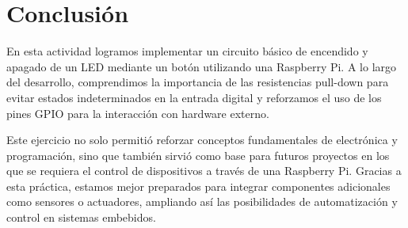\section{Conclusión}

En esta actividad logramos implementar un circuito básico de encendido y apagado de un LED mediante un botón utilizando una Raspberry Pi. A lo largo del desarrollo, comprendimos la importancia de las resistencias pull-down para evitar estados indeterminados en la entrada digital y reforzamos el uso de los pines GPIO para la interacción con hardware externo.

Este ejercicio no solo permitió reforzar conceptos fundamentales de electrónica y programación, sino que también sirvió como base para futuros proyectos en los que se requiera el control de dispositivos a través de una Raspberry Pi. Gracias a esta práctica, estamos mejor preparados para integrar componentes adicionales como sensores o actuadores, ampliando así las posibilidades de automatización y control en sistemas embebidos.

